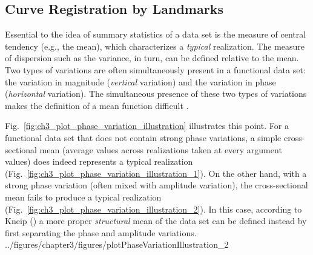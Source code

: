 \subsection{Curve Registration by Landmarks}\label{sub:sa_registration}

Essential to the idea of summary statistics of a data set is the measure of central tendency (e.g., the mean),
which characterizes a \emph{typical} realization.
The measure of dispersion such as the variance, in turn, can be defined relative to the mean. 
Two types of variations are often simultaneously present in a functional data set: 
the variation in magnitude (\emph{vertical} variation) and the variation in phase (\emph{horizontal} variation).
The simultaneous presence of these two types of variations makes the definition of a mean function difficult \cite{Kneip1992}.

Fig.~\ref{fig:ch3_plot_phase_variation_illustration} illustrates this point.
For a functional data set that does not contain strong phase variations, 
a simple cross-sectional mean (average values across realizations taken at every argument values) does indeed represents a typical realization (Fig.~\ref{fig:ch3_plot_phase_variation_illustration_1}).
On the other hand, with a strong phase variation (often mixed with amplitude variation), 
the cross-sectional mean fails to produce a typical realization (Fig.~\ref{fig:ch3_plot_phase_variation_illustration_2}).
In this case,
according to Kneip (\cite{Kneip1992}) a more proper \emph{structural} mean of the data set can be defined instead
by first separating the phase and amplitude variations.
{../figures/chapter3/figures/plotPhaseVariationIllustration_2}

